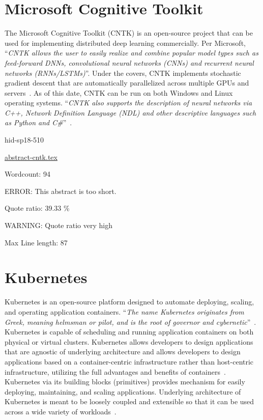 \section{Microsoft Cognitive Toolkit}

The Microsoft Cognitive Toolkit (CNTK) is an open-source project that
can be used for implementing distributed deep learning commercially.
Per Microsoft, \color{blue}``\emph{CNTK allows the user to easily realize and combine
popular model types such as feed-forward DNNs, convolutional neural
networks (CNNs) and recurrent neural networks (RNNs/LSTMs)}''\color{black}. Under the
covers, CNTK implements stochastic gradient descent that are
automatically parallelized across multiple GPUs and
servers~\cite{hid-sp18-510-web-cntk}. As of this date, CNTK can be run
on both Windows and Linux operating systems. \color{blue}``\emph{CNTK also supports the
description of neural networks via C++, Network Definition
Language (NDL) and other descriptive languages such as Python and
C\#}''\color{black}~\cite{hid-sp18-510-kd-cntk}.


\begin{IU}

hid-sp18-510

\href{https://github.com/cloudmesh-community/hid-sp18-510/blob/master//technology/abstract-cntk.tex}{abstract-cntk.tex}

 

Wordcount: 94

ERROR: This abstract is too short.


Quote ratio: 39.33 \%

WARNING: Quote ratio very high
 
Max Line length: 87
\end{IU}

\section{Kubernetes}

Kubernetes is an open-source platform designed to automate deploying,
scaling, and operating application containers. \color{blue}``\emph{The name Kubernetes
originates from Greek, meaning helmsman or pilot, and is the root of
governor and cybernetic}''\color{black}~\cite{hid-sp18-510-web-Kubernetes}.
Kubernetes is capable of scheduling and running application containers
on both physical or virtual clusters. Kubernetes allows developers to
design applications that are agnostic of underlying architecture and
allows developers to design applications based on a container-centric
infrastructure rather than host-centric infrastructure, utilizing the
full advantages and benefits of
containers~\cite{hid-sp18-510-med-Kubernetes}. Kubernetes via its
building blocks (primitives) provides mechanism for easily deploying,
maintaining, and scaling applications. Underlying architecture of
Kubernetes is meant to be loosely coupled and extensible so that it
can be used across a wide variety of
workloads~\cite{hid-sp18-510-wiki-Kubernetes}.


